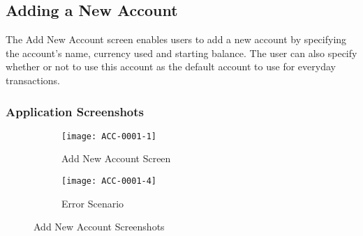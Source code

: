 
\subsection{Adding a New Account}

The Add New Account screen enables users to add a new account by specifying the account's name, currency used and starting balance. The user can also specify whether or not to use this account as the default account to use for everyday transactions.

\subsubsection{Application Screenshots}
\begin{figure}[h]
 
\begin{subfigure}{0.5\textwidth}
  \texttt{[image: ACC-0001-1]} 
  \caption{Add New Account Screen}
  \label{fig:sub-account-1}
\end{subfigure}
\begin{subfigure}{0.5\textwidth}
  \texttt{[image: ACC-0001-4]}
  \caption{Error Scenario}
  \label{fig:sub-account-2}
\end{subfigure}
 
\caption{Add New Account Screenshots}
\label{fig:account-1}
\end{figure}

